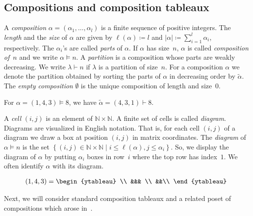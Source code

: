 \documentclass[ALCO,ThmDefs,Unicode,epreuves]{cedram}
\newcommand{\N}{\mathbb N}
\newcommand{\set}[1]{\left\{ #1 \right\}}
\newcommand{\parts}[2]{{(#1_1, \ldots, #1_{#2})}}
\begin{document}
\subsection{Compositions and composition tableaux}
\label{sec:compositions_and_composition_tableaux}

A \emph{composition} $\alpha = \parts{\alpha}l$ is a finite sequence of positive integers. 
The \emph{length} and the \emph{size} of $\alpha$ are given by $\ell(\alpha)\coloneqq l$ and $|\alpha| \coloneqq \sum_{i=1}^l \alpha_i$, respectively.
The $\alpha_i$'s are called \emph{parts} of $\alpha$. If $\alpha$ has size~$n$, $\alpha$ is called \emph{composition of~$n$} and we write $\alpha \vDash n$.
A \emph{partition} is a composition whose parts are weakly decreasing. 
We write $\lambda \vdash n$ if $\lambda$ is a partition of size~$n$.
For a composition $\alpha$ we denote the partition obtained by sorting the parts of $\alpha$ in decreasing order by $\widetilde \alpha$. The \emph{empty composition} $\emptyset$ is the unique composition of length and size~$0$.

\begin{exam} 
	For $\alpha=(1,4,3)\vDash 8$, we have $\widetilde \alpha = (4,3,1)\vdash 8$.
\end{exam}

A \emph{cell} $(i,j)$ is an element of $\N \times \N$.
A finite set of cells is called \emph{diagram}. Diagrams are visualized in English notation. That is, for each cell $(i,j)$ of a diagram we draw a box at position $(i,j)$ in matrix coordinates.
The \emph{diagram} of $\alpha\vDash n$ is the set $\set{(i,j)\in \N \times \N \mid i \leq \ell(\alpha), j \leq \alpha_i}$. So, we display the diagram of $\alpha$ by putting $\alpha_i$ boxes in row~$i$ where the top row has index~$1$.
We often identify $\alpha$ with its diagram.

\begin{exam}
	\begin{align*}
		(1,4,3) = 
		\begin{ytableau} 
		 \\
			&&& \\
			&&\\
		\end{ytableau}
	\end{align*}
\end{exam}

Next, we will consider standard composition tableaux and a related poset of compositions which arose in~\cite{Bessenrodt2011}.
\end{document}
